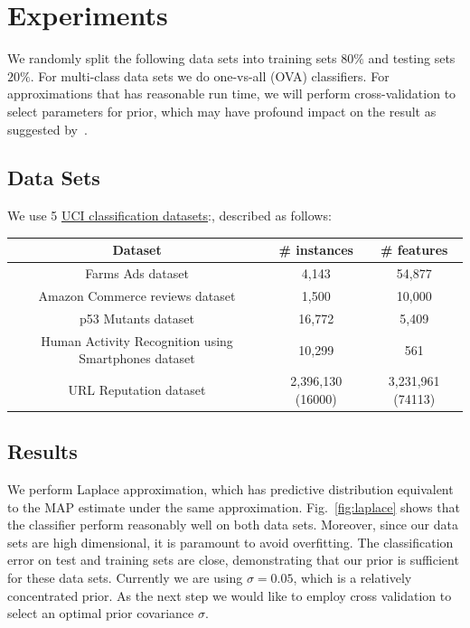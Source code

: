 \section{Experiments}
\label{sec:experiments}

We randomly split the following data sets into training sets $80\%$ and
testing sets $20\%$. For multi-class data sets we do one-vs-all (OVA)
classifiers. For approximations that has reasonable run time, we will perform
cross-validation to select parameters for prior, which may have profound
impact on the result as suggested by~\cite{Asuncion2009smoothing}. 

\subsection{Data Sets}


We use 5 \href{http://archive.ics.uci.edu/ml/datasets.html}{UCI classification
datasets}:, described as follows:

\begin{tabular}{| c | c |  c |}
\hline
Dataset & \# instances & \# features \\
\hline
Farms Ads dataset & 4,143 & 54,877 \\
\hline
Amazon Commerce reviews dataset & 1,500 & 10,000 \\
\hline
p53 Mutants dataset & 16,772 & 5,409 \\
\hline
Human Activity Recognition using Smartphones dataset & 10,299 & 561\\
\hline
URL Reputation dataset\footnotemark[1] & 2,396,130 (16000) & 3,231,961 (74113) \\
\hline
\end{tabular}


\subsection{Results}

We perform Laplace approximation, which has predictive distribution equivalent
to the MAP estimate under the same approximation. Fig.~\ref{fig:laplace} shows
that the classifier perform reasonably well on both data sets. Moreover, since
our data sets are high dimensional, it is paramount to avoid overfitting. The
classification error on test and training sets are close, demonstrating that
our prior is sufficient for these data sets. Currently we are using $\sigma =
0.05$, which is a relatively concentrated prior. As the next step we would
like to employ cross validation to select an optimal prior covariance $\sigma$.

